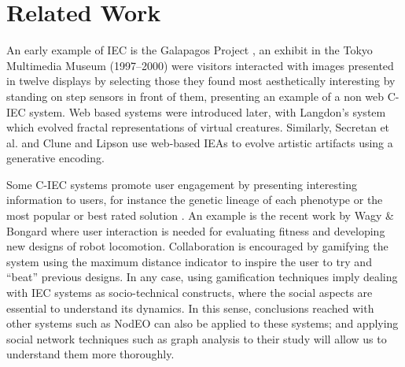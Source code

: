 \section{Related Work}
\label{sec:related}

An early example of IEC is the Galapagos Project \cite{sims1997interactivity},
an exhibit in the Tokyo Multimedia Museum (1997--2000) 
were visitors interacted with images presented in 
twelve displays by selecting those they found most aesthetically interesting by standing on
step sensors in front of them, presenting an example of a non web
C-IEC system. Web based systems were introduced later, with  
Langdon's system \cite{langdon:2004} which evolved fractal representations of virtual creatures. 
Similarly, Secretan et al. \cite{picbreeder} and Clune and Lipson \cite{forms} 
use web-based IEAs to evolve artistic artifacts using a generative encoding.

Some C-IEC systems promote user engagement by presenting interesting information to 
users, for instance the genetic lineage of each phenotype or the most popular or 
best rated solution \cite{picbreeder,forms}. An example is the recent work by 
Wagy \& Bongard \cite{wagy2014collective} where user interaction 
is needed for evaluating fitness and developing
new designs of robot locomotion. Collaboration is encouraged by gamifying the system 
using the maximum distance indicator to inspire the user to try and ``beat'' previous designs. 
In any case, using gamification techniques imply dealing with IEC
systems as socio-technical constructs, where the social aspects are
essential to understand its dynamics. In this sense, conclusions
reached with other systems such as NodEO \cite{DBLP:conf/gecco/MereloCGCRV16}
can also be applied to these systems; and applying social 
network techniques such as graph analysis
to their study will allow us to understand them more thoroughly. 

